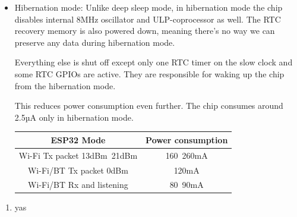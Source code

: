 \documentclass[a4paper ,12pt, onecolumn]{article}
\begin{document}
\begin{itemize}
    \item Hibernation mode: Unlike deep sleep mode, in hibernation mode the chip disables internal 8MHz oscillator and ULP-coprocessor as well. The RTC recovery memory is also powered down, meaning there’s no way we can preserve any data during hibernation mode.

    Everything else is shut off except only one RTC timer on the slow clock and some RTC GPIOs are active. They are responsible for waking up the chip from the hibernation mode.
    
    This reduces power consumption even further. The chip consumes around 2.5µA only in hibernation mode.

    \begin{center}
        \begin{tabular}{||c | c ||} 
        \hline
        ESP32 Mode & Power consumption  \\ [0.5ex] 
        \hline\hline
        Wi-Fi Tx packet 13dBm~21dBm & 160~260mA  \\ 
        \hline
        Wi-Fi/BT Tx packet 0dBm	 & 120mA  \\
        \hline
        Wi-Fi/BT Rx and listening & 80~90mA  \\
        \hline
       \end{tabular}
       \end{center}
\end{itemize}
\begin{enumerate}
    \item  yas
\end{enumerate}
\end{document}
